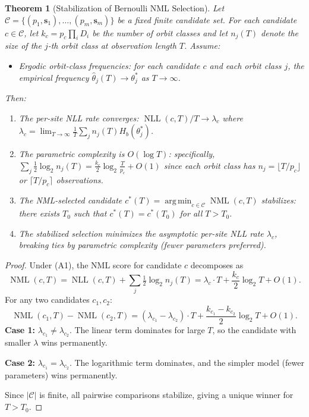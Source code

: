 \documentclass[11pt]{article}
\newtheorem{theorem}{Theorem}
\theoremstyle{definition}
\theoremstyle{remark}
\DeclareMathOperator*{\argmin}{arg\,min}
\newcommand{\bs}{\mathbf{s}}
\newcommand{\NML}{\operatorname{NML}}
\newcommand{\NLL}{\operatorname{NLL}}
\newcommand{\Hb}{H_b}
\begin{document}
\begin{theorem}[Stabilization of Bernoulli NML Selection]\label{thm:stabilization}
Let $\mathcal{C} = \{(p_1, \bs_1), \ldots, (p_m, \bs_m)\}$ be a fixed finite candidate set.
For each candidate $c \in \mathcal{C}$, let $k_c = p_c \prod_i D_i$ be the number of orbit classes and let $n_j(T)$ denote the size of the $j$-th orbit class at observation length $T$.
Assume:
\begin{itemize}
    \item[\textup{(A1)}] \emph{Ergodic orbit-class frequencies}: for each candidate $c$ and each orbit class $j$, the empirical frequency $\hat{\theta}_j(T) \to \theta_j^*$ as $T \to \infty$.
\end{itemize}
Then:
\begin{enumerate}
    \item[\textup{(i)}] The per-site NLL rate converges: $\NLL(c, T) / T \to \lambda_c$ where $\lambda_c = \lim_{T\to\infty} \frac{1}{T}\sum_j n_j(T) \Hb(\theta_j^*)$.
    \item[\textup{(ii)}] The parametric complexity is $O(\log T)$: specifically, $\sum_j \frac{1}{2}\log_2 n_j(T) = \frac{k_c}{2} \log_2 \frac{T}{p_c} + O(1)$ since each orbit class has $n_j = \lfloor T/p_c \rfloor$ or $\lceil T/p_c \rceil$ observations.
    \item[\textup{(iii)}] The NML-selected candidate $c^*(T) = \argmin_{c \in \mathcal{C}} \NML(c, T)$ stabilizes: there exists $T_0$ such that $c^*(T) = c^*(T_0)$ for all $T > T_0$.
    \item[\textup{(iv)}] The stabilized selection minimizes the asymptotic per-site NLL rate $\lambda_c$, breaking ties by parametric complexity (fewer parameters preferred).
\end{enumerate}
\end{theorem}

\begin{proof}
Under (A1), the NML score for candidate $c$ decomposes as
\[
\NML(c, T) = \NLL(c, T) + \sum_j \tfrac{1}{2}\log_2 n_j(T) = \lambda_c \cdot T + \frac{k_c}{2}\log_2 T + O(1).
\]
For any two candidates $c_1, c_2$:
\[
\NML(c_1, T) - \NML(c_2, T) = (\lambda_{c_1} - \lambda_{c_2}) \cdot T + \frac{k_{c_1} - k_{c_2}}{2} \log_2 T + O(1).
\]
\textbf{Case 1:} $\lambda_{c_1} \neq \lambda_{c_2}$.
The linear term dominates for large $T$, so the candidate with smaller $\lambda$ wins permanently.

\textbf{Case 2:} $\lambda_{c_1} = \lambda_{c_2}$.
The logarithmic term dominates, and the simpler model (fewer parameters) wins permanently.

Since $|\mathcal{C}|$ is finite, all pairwise comparisons stabilize, giving a unique winner for $T > T_0$.
\end{proof}
\end{document}
